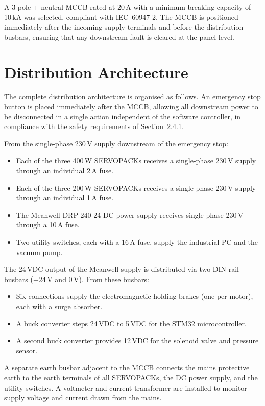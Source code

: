 A 3-pole + neutral MCCB rated at 20\,A with a minimum breaking capacity of 10\,kA was selected, compliant with IEC~60947-2. The MCCB is positioned immediately after the incoming supply terminals and before the distribution busbars, ensuring that any downstream fault is cleared at the panel level.

\section{Distribution Architecture}

The complete distribution architecture is organised as follows. An emergency stop button is placed immediately after the MCCB, allowing all downstream power to be disconnected in a single action independent of the software controller, in compliance with the safety requirements of Section~2.4.1.

From the single-phase 230\,V supply downstream of the emergency stop:
\begin{itemize}
    \item Each of the three 400\,W SERVOPACKs receives a single-phase 230\,V supply through an individual 2\,A fuse.
    \item Each of the three 200\,W SERVOPACKs receives a single-phase 230\,V supply through an individual 1\,A fuse.
    \item The Meanwell DRP-240-24 DC power supply receives single-phase 230\,V through a 10\,A fuse.
    \item Two utility switches, each with a 16\,A fuse, supply the industrial PC and the vacuum pump.
\end{itemize}

The 24\,VDC output of the Meanwell supply is distributed via two DIN-rail busbars (+24\,V and 0\,V). From these busbars:
\begin{itemize}
    \item Six connections supply the electromagnetic holding brakes (one per motor), each with a surge absorber.
    \item A buck converter steps 24\,VDC to 5\,VDC for the STM32 microcontroller.
    \item A second buck converter provides 12\,VDC for the solenoid valve and pressure sensor.
\end{itemize}

A separate earth busbar adjacent to the MCCB connects the mains protective earth to the earth terminals of all SERVOPACKs, the DC power supply, and the utility switches. A voltmeter and current transformer are installed to monitor supply voltage and current drawn from the mains.

